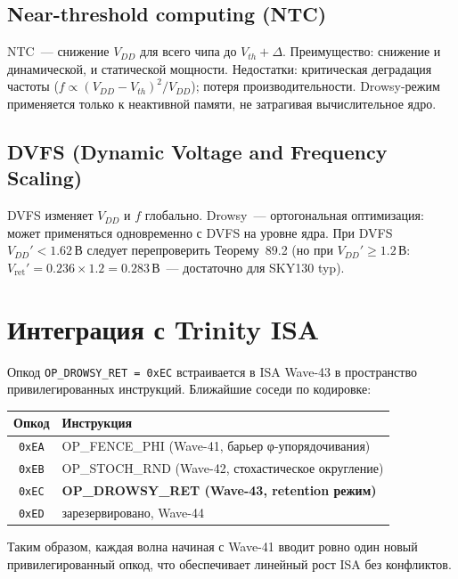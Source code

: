 \subsection{Near-threshold computing (NTC)}

NTC~--- снижение $V_{DD}$ для всего чипа до $V_{th} + \Delta$.
Преимущество: снижение и динамической, и статической мощности.
Недостатки: критическая деградация частоты ($f \propto (V_{DD}-V_{th})^2/V_{DD}$);
потеря производительности.
Drowsy-режим применяется только к неактивной памяти,
не затрагивая вычислительное ядро.

\subsection{DVFS (Dynamic Voltage and Frequency Scaling)}

DVFS изменяет $V_{DD}$ и $f$ глобально.
Drowsy~--- ортогональная оптимизация:
может применяться одновременно с DVFS на уровне ядра.
При DVFS $V_{DD}' < 1.62\,\text{В}$ следует перепроверить Теорему~89.2
(но при $V_{DD}' \geq 1.2\,\text{В}$:
$V_\mathrm{ret}' = 0.236 \times 1.2 = 0.283\,\text{В}$~--- достаточно для SKY130 typ).

\section{Интеграция с Trinity ISA}
\label{sec:glava89-isa}

Опкод \texttt{OP\_DROWSY\_RET~=~0xEC} встраивается в ISA Wave-43
в пространство привилегированных инструкций.
Ближайшие соседи по кодировке:
\begin{center}
\begin{tabular}{|c|l|}
  \hline
  \textbf{Опкод} & \textbf{Инструкция} \\
  \hline
  \texttt{0xEA} & OP\_FENCE\_PHI (Wave-41, барьер φ-упорядочивания) \\
  \texttt{0xEB} & OP\_STOCH\_RND (Wave-42, стохастическое округление) \\
  \texttt{0xEC} & \textbf{OP\_DROWSY\_RET (Wave-43, retention режим)} \\
  \texttt{0xED} & зарезервировано, Wave-44 \\
  \hline
\end{tabular}
\end{center}

Таким образом, каждая волна начиная с Wave-41 вводит ровно один
новый привилегированный опкод, что обеспечивает
линейный рост ISA без конфликтов.

